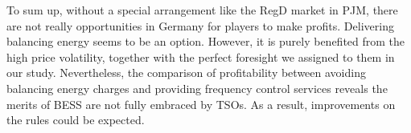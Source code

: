 


To sum up, without a special arrangement like the RegD market in PJM, there are not really opportunities in Germany for players to make profits. Delivering balancing energy seems to be an option. However, it is purely benefited from the high price volatility, together with the perfect foresight we assigned to them in our study. Nevertheless, the comparison of profitability between avoiding balancing energy charges and providing frequency control services reveals the merits of BESS are not fully embraced by TSOs. As a result, improvements on the rules could be expected.



